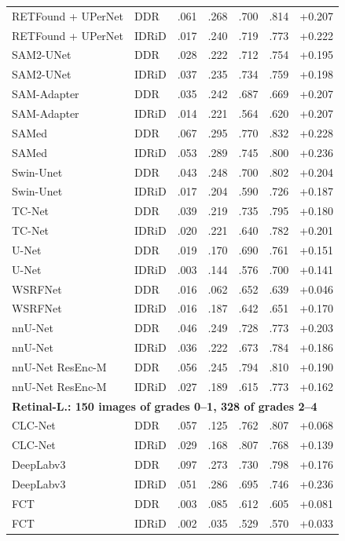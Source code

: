 {\begin{longtable}{l l c c c c c}
RETFound + UPerNet & DDR & .061 & .268 & .700 & .814 & +0.207 \\
RETFound + UPerNet & IDRiD & .017 & .240 & .719 & .773 & +0.222 \\
SAM2-UNet & DDR & .028 & .222 & .712 & .754 & +0.195 \\
SAM2-UNet & IDRiD & .037 & .235 & .734 & .759 & +0.198 \\
SAM-Adapter & DDR & .035 & .242 & .687 & .669 & +0.207 \\
SAM-Adapter & IDRiD & .014 & .221 & .564 & .620 & +0.207 \\
SAMed & DDR & .067 & .295 & .770 & .832 & +0.228 \\
SAMed & IDRiD & .053 & .289 & .745 & .800 & +0.236 \\
Swin-Unet & DDR & .043 & .248 & .700 & .802 & +0.204 \\
Swin-Unet & IDRiD & .017 & .204 & .590 & .726 & +0.187 \\
TC-Net & DDR & .039 & .219 & .735 & .795 & +0.180 \\
TC-Net & IDRiD & .020 & .221 & .640 & .782 & +0.201 \\
U-Net & DDR & .019 & .170 & .690 & .761 & +0.151 \\
U-Net & IDRiD & .003 & .144 & .576 & .700 & +0.141 \\
WSRFNet & DDR & .016 & .062 & .652 & .639 & +0.046 \\
WSRFNet & IDRiD & .016 & .187 & .642 & .651 & +0.170 \\
nnU-Net & DDR & .046 & .249 & .728 & .773 & +0.203 \\
nnU-Net & IDRiD & .036 & .222 & .673 & .784 & +0.186 \\
nnU-Net ResEnc-M & DDR & .056 & .245 & .794 & .810 & +0.190 \\
nnU-Net ResEnc-M & IDRiD & .027 & .189 & .615 & .773 & +0.162 \\
\multicolumn{7}{l}{\textbf{Retinal-L.: 150 images of grades 0--1, 328 of grades 2--4}}\\
CLC-Net & DDR & .057 & .125 & .762 & .807 & +0.068 \\
CLC-Net & IDRiD & .029 & .168 & .807 & .768 & +0.139 \\
DeepLabv3 & DDR & .097 & .273 & .730 & .798 & +0.176 \\
DeepLabv3 & IDRiD & .051 & .286 & .695 & .746 & +0.236 \\
FCT & DDR & .003 & .085 & .612 & .605 & +0.081 \\
FCT & IDRiD & .002 & .035 & .529 & .570 & +0.033 \\

\end{longtable}}
